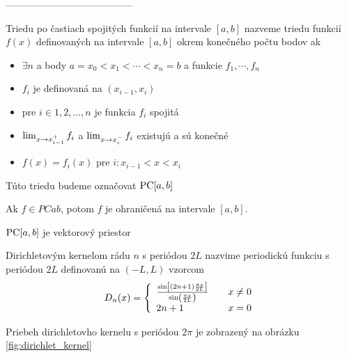 ---------------------------------------
\begin{definicia}
    Triedu po častiach spojitých funkcií na intervale $[a,b]$ nazveme
    triedu funkcií $f(x)$ definovaných na intervale $[a,b]$ okrem
    konečného počtu bodov ak
    \begin{itemize}
        \item
            $\exists n$ a body $a=x_0<x_1<\cdots<x_n=b$ a funkcie
            $f_1, \cdots, f_n$
        \item
            $f_i$ je definovaná na $(x_{i-1},x_i)$
        \item
            pre $i \in 1,2,\dots,n$ je funkcia $f_i$ spojitá
        \item
            $\lim_{x \rightarrow x_{i-1}^+} f_i$ a 
            $\lim_{x \rightarrow x_i^-} f_i$ existujú a sú konečné
        \item
            $f(x) = f_i(x)$ pre $i: x_{i-1} < x < x_i$
    \end{itemize}
    Túto triedu budeme označovat $\mbox{PC}[a,b]$
\end{definicia}

\begin{lema}
    Ak $f \in PCab$, potom $f$ je ohraničená na intervale $[a,b]$.
    \label{lema:ohranicenost_na_pcab}
\end{lema}

\begin{lema}
    $\mbox{PC}[a,b]$ je vektorový priestor
\end{lema}
\begin{dokaz}
\end{dokaz}

\begin{definicia}
Dirichletovým kernelom  rádu $n$ s periódou $2L$ nazvime periodickú funkciu
s periódou $2L$ definovanú na $(-L,L)$ vzorcom
\begin{equation}
    D_n(x) = \left\{
        \begin{array}{l l}
            \frac{\sin\left[(2n+1) \frac{\pi x}{2 L}\right]}{
            \sin\left(\frac{\pi x}{2 L}\right)} \quad& x\not=0 \\
            2n+1 \quad& x=0
        \end{array}
    \right.
\end{equation}
\end{definicia}

Priebeh dirichletovho kernelu s periódou $2\pi$ je zobrazený na
obrázku
\ref{fig:dirichlet_kernel}

